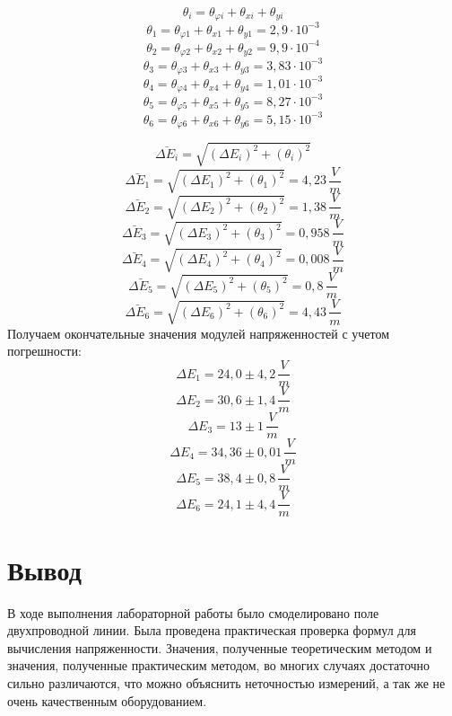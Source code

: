 \documentclass[a4paper,12pt]{report}
\begin{document}
\[ \theta_i = \theta_{\varphi i} + \theta_{xi} + \theta_{yi} \]
\[ \theta_1 = \theta_{\varphi 1} + \theta_{x1} + \theta_{y1} = 2,9\cdot 10^{-3} \]
\[ \theta_2 = \theta_{\varphi 2} + \theta_{x2} + \theta_{y2} = 9,9\cdot 10^{-4}\]
\[ \theta_3 = \theta_{\varphi 3} + \theta_{x3} + \theta_{y3} = 3,83\cdot 10^{-3}\]
\[ \theta_4 = \theta_{\varphi 4} + \theta_{x4} + \theta_{y4} = 1,01\cdot 10^{-3}\]
\[ \theta_5 = \theta_{\varphi 5} + \theta_{x5} + \theta_{y5} = 8,27 \cdot 10^{-3}\]
\[ \theta_6 = \theta_{\varphi 6} + \theta_{x6} + \theta_{y6} = 5,15 \cdot 10^{-3}\]

\[ \bar{\Delta E_i} = \sqrt{(\Delta E_i)^2 + (\theta_i)^2} \]
\[ \bar{\Delta E_1} = \sqrt{(\Delta E_1)^2 + (\theta_1)^2} = 4,23 \, \frac{V}{m}\]
\[ \bar{\Delta E_2} = \sqrt{(\Delta E_2)^2 + (\theta_2)^2} = 1,38\, \frac{V}{m}\]
\[ \bar{\Delta E_3} = \sqrt{(\Delta E_3)^2 + (\theta_3)^2} = 0,958\, \frac{V}{m}\]
\[ \bar{\Delta E_4} = \sqrt{(\Delta E_4)^2 + (\theta_4)^2} = 0,008\, \frac{V}{m}\]
\[ \bar{\Delta E_5} = \sqrt{(\Delta E_5)^2 + (\theta_5)^2} = 0,8\, \frac{V}{m}\]
\[ \bar{\Delta E_6} = \sqrt{(\Delta E_6)^2 + (\theta_6)^2} = 4,43\, \frac{V}{m}\]
Получаем окончательные значения модулей напряженностей с учетом погрешности:
\[ \Delta E_1 = 24,0 \pm 4,2 \, \frac{V}{m}\]
\[ \Delta E_2 = 30,6 \pm 1,4 \, \frac{V}{m}\]
\[ \Delta E_3 = 13 \pm 1 \, \frac{V}{m}\]
\[ \Delta E_4 = 34,36 \pm 0,01 \, \frac{V}{m}\]
\[ \Delta E_5 = 38,4 \pm 0,8 \, \frac{V}{m}\]
\[ \Delta E_6 = 24,1 \pm 4,4 \, \frac{V}{m}\]
\newpage
\section*{Вывод}

В ходе выполнения лабораторной работы было смоделировано поле двухпроводной линии.
Была проведена практическая проверка формул для вычисления напряженности. 
Значения, полученные теоретическим методом и значения, полученные практическим методом, во многих случаях достаточно сильно  различаются, что можно объяснить неточностью измерений, а так же
не очень качественным оборудованием. 
\end{document}

